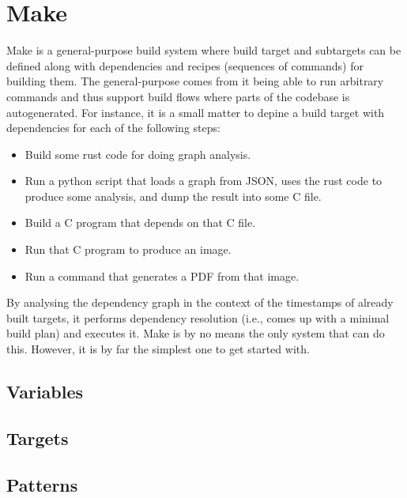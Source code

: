 \section{Make}

Make is a general-purpose build system where build target and subtargets can be defined along with dependencies and recipes (sequences of commands) for building them. The general-purpose comes from it being able to run arbitrary commands and thus support build flows where parts of the codebase is autogenerated. For instance, it is a small matter to depine a build target with dependencies for each of the following steps:
\begin{itemize}
  \item Build some rust code for doing graph analysis.
  \item Run a python script that loads a graph from JSON, uses the rust code to produce some analysis, and dump the result into some C file.
  \item Build a C program that depends on that C file.
  \item Run that C program to produce an image.
  \item Run a command that generates a PDF from that image.
\end{itemize}

By analysing the dependency graph in the context of the timestamps of already built targets, it performs dependency resolution (i.e., comes up with a minimal build plan) and executes it. Make is by no means the only system that can do this. However, it is by far the simplest one to get started with.

\subsection{Variables}

\subsection{Targets}

\subsection{Patterns}
